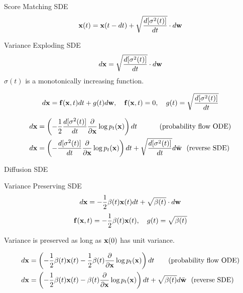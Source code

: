 \documentclass{beamer}
\renewcommand{\eqpause}{}
\begin{document}
\begin{frame}{Score Matching SDE}
	\vspace{-0.3cm}
	\[
		\mathbf{x}(t) = \mathbf{x}(t - dt) + \sqrt{\frac{ d [\sigma^2(t)]}{dt}} \cdot d \mathbf{w}
	\]
    \eqpause
	\vspace{-0.5cm}
	\begin{block}{Variance Exploding SDE}
		\vspace{-0.3cm}
		\[
			d \mathbf{x} = \sqrt{\frac{ d [\sigma^2(t)]}{dt}} \cdot d \mathbf{w}
		\]
		$\sigma(t)$ is a monotonically increasing function.
	\end{block}
    \eqpause
	\vspace{-0.7cm}
	\[
		d\mathbf{x} = \mathbf{f}(\mathbf{x}, t) dt + g(t) d \mathbf{w}, \quad \mathbf{f}(\mathbf{x}, t) = 0, \quad g(t) = \sqrt{\frac{ d [\sigma^2(t)]}{dt}} 
	\]
    \eqpause
	\vspace{-0.5cm}
	\begin{align*}
		d\mathbf{x} &= \left(-\frac{1}{2} \frac{ d [\sigma^2(t)]}{dt} \frac{\partial}{\partial \mathbf{x}} \log p_t(\mathbf{x}) \right) dt \qquad\quad\, \text{(probability flow ODE)} \\
		d\mathbf{x} &= \left(- \frac{ d [\sigma^2(t)]}{dt} \frac{\partial}{\partial \mathbf{x}}\log p_t(\mathbf{x})\right) dt + \sqrt{\frac{ d [\sigma^2(t)]}{dt}}  d \bar{\mathbf{w}} \ \ \text{(reverse SDE)}
	\end{align*}
\end{frame}
\begin{frame}{Diffusion SDE}
	\begin{block}{Variance Preserving SDE}
		\vspace{-0.3cm}
		\[
			d \mathbf{x} = - \frac{1}{2} \beta(t) \mathbf{x}(t) dt + \sqrt{\beta(t)} \cdot d \mathbf{w}
		\]
		\[
			\mathbf{f}(\mathbf{x}, t) = - \frac{1}{2} \beta(t) \mathbf{x}(t) , \quad g(t) = \sqrt{\beta(t)} 
		\]
	\end{block}
	Variance is preserved as long as $\mathbf{x}(0)$ has unit variance.
    \eqpause
	\begin{align*}
		d\mathbf{x} &= \left(- \frac{1}{2} \beta(t) \mathbf{x}(t) - \frac{1}{2} \beta(t) \frac{\partial}{\partial \mathbf{x}} \log p_t(\mathbf{x}) \right) dt \quad\quad \text{(probability flow ODE)} \\
		d\mathbf{x} &= \left(- \frac{1}{2} \beta(t) \mathbf{x}(t) - \beta(t) \frac{\partial}{\partial \mathbf{x}} \log p_t(\mathbf{x})\right) dt + \sqrt{\beta(t)} d \bar{\mathbf{w}}\ \ \text{(reverse SDE)}
	\end{align*}
\end{frame}
\end{document}
